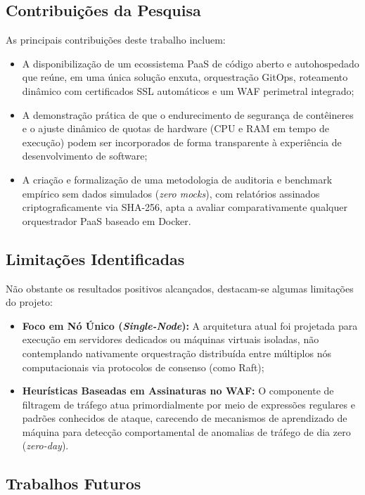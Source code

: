 \subsection{Contribuições da Pesquisa}
\label{sec:contribuicoes}

As principais contribuições deste trabalho incluem:
\begin{itemize}
    \item A disponibilização de um ecossistema PaaS de código aberto e autohospedado que reúne, em uma única solução enxuta, orquestração GitOps, roteamento dinâmico com certificados SSL automáticos e um WAF perimetral integrado;
    \item A demonstração prática de que o endurecimento de segurança de contêineres e o ajuste dinâmico de quotas de hardware (CPU e RAM em tempo de execução) podem ser incorporados de forma transparente à experiência de desenvolvimento de software;
    \item A criação e formalização de uma metodologia de auditoria e benchmark empírico sem dados simulados (\textit{zero mocks}), com relatórios assinados criptograficamente via SHA-256, apta a avaliar comparativamente qualquer orquestrador PaaS baseado em Docker.
\end{itemize}

\subsection{Limitações Identificadas}
\label{sec:limitacoes}

Não obstante os resultados positivos alcançados, destacam-se algumas limitações do projeto:
\begin{itemize}
    \item \textbf{Foco em Nó Único (\textit{Single-Node}):} A arquitetura atual foi projetada para execução em servidores dedicados ou máquinas virtuais isoladas, não contemplando nativamente orquestração distribuída entre múltiplos nós computacionais via protocolos de consenso (como Raft);
    \item \textbf{Heurísticas Baseadas em Assinaturas no WAF:} O componente de filtragem de tráfego atua primordialmente por meio de expressões regulares e padrões conhecidos de ataque, carecendo de mecanismos de aprendizado de máquina para detecção comportamental de anomalias de tráfego de dia zero (\textit{zero-day}).
\end{itemize}

\subsection{Trabalhos Futuros}
\label{sec:trabalhos-futuros}


